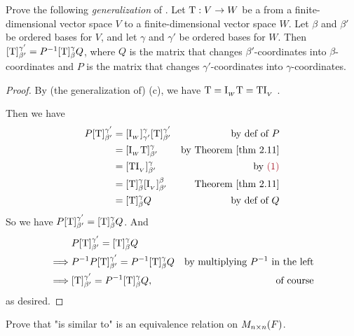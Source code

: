 \begin{exercise} \label{exercise 2.5.8}
Prove the following \emph{generalization} of .
Let \(\mathrm{T} : V \to W\) be a \LTRAN{} from a finite-dimensional vector space \(V\) to a finite-dimensional vector space \(W\).
Let \(\beta\) and \(\beta'\) be ordered bases for \(V\), and let \(\gamma\) and \(\gamma'\) be ordered bases for \(W\).
Then \([\mathrm{T}]_{\beta'}^{\gamma'} = P^{-1} [\mathrm{T}]_{\beta}^{\gamma} Q\), where \(Q\) is the matrix that changes \(\beta'\)-coordinates into \(\beta\)-coordinates and \(P\) is the matrix that changes \(\gamma'\)-coordinates into \(\gamma\)-coordinates.
\end{exercise}

\begin{proof}
By (the generalization of) (c), we have \(\mathrm{T} = \mathrm{I}_{_W} \mathrm{T} = \mathrm{T} \mathrm{I}_{_V}\) .

Then we have
\begin{align*}
    P [\T]_{\beta'}^{\gamma'}
        & = [\ITRANW]_{\gamma'}^{\gamma} [\T]_{\beta'}^{\gamma'} & \text{by def of \(P\)} \\
        & = [\ITRANW\T]_{\beta'}^{\gamma} & \text{by \THM{2.11}} \\
        & = [\T\ITRANV]_{\beta'}^{\gamma} & \text{by \MAROON{(1)}} \\
        & = [\T]_{\beta}^{\gamma} [\ITRANV]_{\beta'}^{\beta} & \text{\THM{2.11}} \\
        & = [\T]_{\beta}^{\gamma} Q & \text{by def of \(Q\)}
\end{align*}
So we have \(P [\mathrm{T}]_{\beta'}^{\gamma'} = [\mathrm{T}]_{\beta}^{\gamma} Q\).
And
\begin{align*}
             & P [\mathrm{T}]_{\beta'}^{\gamma'} = [\mathrm{T}]_{\beta}^{\gamma} Q \\
    \implies & P^{-1} P [\mathrm{T}]_{\beta'}^{\gamma'} = P^{-1} [\mathrm{T}]_{\beta}^{\gamma} Q & \text{by multiplying \(P^{-1}\) in the left} \\
    \implies & [\mathrm{T}]_{\beta'}^{\gamma'} = P^{-1} [\mathrm{T}]_{\beta}^{\gamma} Q, & \text{of course}
\end{align*}
as desired.
\end{proof}

\begin{exercise} \label{exercise 2.5.9}
Prove that "is similar to" is an equivalence relation on \(M_{n \times n}(F)\).
\end{exercise}

